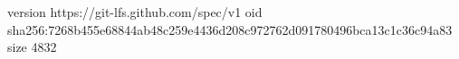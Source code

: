 version https://git-lfs.github.com/spec/v1
oid sha256:7268b455e68844ab48c259e4436d208c972762d091780496bca13c1c36c94a83
size 4832
